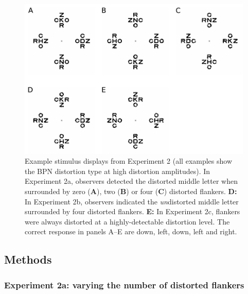 \documentclass[doc, 11pt,a4paper,natbib]{apa6}\usepackage[]{graphicx}\usepackage[]{color}
\begin{document}
\begin{figure}
	\centering
   \includegraphics[scale=1]{../figures/experiment_2_methods.pdf}
   \caption{
	Example stimulus displays from Experiment 2 (all examples show the BPN distortion type at high distortion amplitudes).
	In Experiment 2a, observers detected the distorted middle letter when surrounded by zero (\textbf{A}), two (\textbf{B}) or four (\textbf{C}) distorted flankers.
	\textbf{D:} In Experiment 2b, observers indicated the \textit{un}distorted middle letter surrounded by four distorted flankers.
    \textbf{E:} In Experiment 2c, flankers were always distorted at a highly-detectable distortion level.
    The correct response in panels A--E are down, left, down, left and right.
   }
   \label{fig:expt_2_methods}
\end{figure}

\subsection{Methods}

\subsubsection{Experiment 2a: varying the number of distorted flankers}
\end{document}
